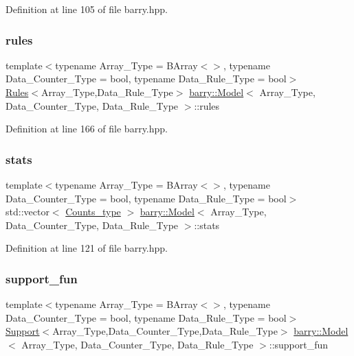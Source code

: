 Definition at line 105 of file barry.\+hpp.

\mbox{\label{classbarry_1_1_model_a53e5242ce0ed2bc7194a0662d09493f2}} 
\subsubsection{\texorpdfstring{rules}{rules}}
{\footnotesize\ttfamily template$<$typename Array\+\_\+\+Type  = B\+Array$<$$>$, typename Data\+\_\+\+Counter\+\_\+\+Type  = bool, typename Data\+\_\+\+Rule\+\_\+\+Type  = bool$>$ \\
\hyperlink{classbarry_1_1_rules}{Rules}$<$Array\+\_\+\+Type,Data\+\_\+\+Rule\+\_\+\+Type$>$ \hyperlink{classbarry_1_1_model}{barry\+::\+Model}$<$ Array\+\_\+\+Type, Data\+\_\+\+Counter\+\_\+\+Type, Data\+\_\+\+Rule\+\_\+\+Type $>$\+::rules}



Definition at line 166 of file barry.\+hpp.

\mbox{\label{classbarry_1_1_model_a09fa1641ee40f23bad698a7c78db4b87}} 
\subsubsection{\texorpdfstring{stats}{stats}}
{\footnotesize\ttfamily template$<$typename Array\+\_\+\+Type  = B\+Array$<$$>$, typename Data\+\_\+\+Counter\+\_\+\+Type  = bool, typename Data\+\_\+\+Rule\+\_\+\+Type  = bool$>$ \\
std\+::vector$<$ \hyperlink{namespacebarry_a3e2d8c3b6cf602107559d4237d9f1315}{Counts\+\_\+type} $>$ \hyperlink{classbarry_1_1_model}{barry\+::\+Model}$<$ Array\+\_\+\+Type, Data\+\_\+\+Counter\+\_\+\+Type, Data\+\_\+\+Rule\+\_\+\+Type $>$\+::stats}



Definition at line 121 of file barry.\+hpp.

\mbox{\label{classbarry_1_1_model_afd005aae0fdd12a8c68d1fd8823b3727}} 
\subsubsection{\texorpdfstring{support\+\_\+fun}{support\_fun}}
{\footnotesize\ttfamily template$<$typename Array\+\_\+\+Type  = B\+Array$<$$>$, typename Data\+\_\+\+Counter\+\_\+\+Type  = bool, typename Data\+\_\+\+Rule\+\_\+\+Type  = bool$>$ \\
\hyperlink{classbarry_1_1_support}{Support}$<$Array\+\_\+\+Type,Data\+\_\+\+Counter\+\_\+\+Type,Data\+\_\+\+Rule\+\_\+\+Type$>$ \hyperlink{classbarry_1_1_model}{barry\+::\+Model}$<$ Array\+\_\+\+Type, Data\+\_\+\+Counter\+\_\+\+Type, Data\+\_\+\+Rule\+\_\+\+Type $>$\+::support\+\_\+fun}



